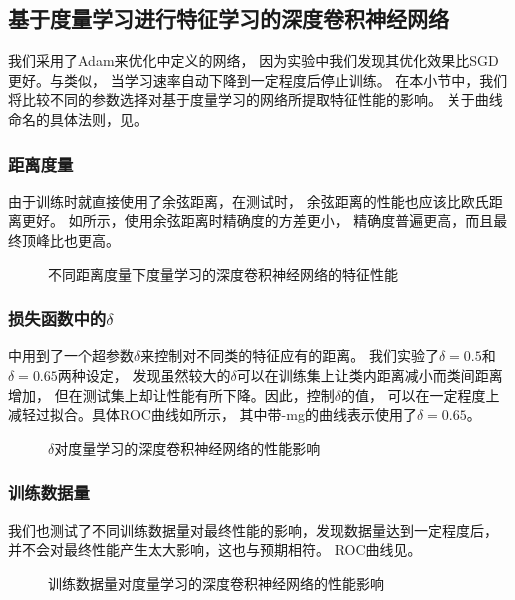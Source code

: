 \subsection{基于度量学习进行特征学习的深度卷积神经网络}
我们采用了Adam\cite{kingma2014adam}来优化中定义的网络，
因为实验中我们发现其优化效果比SGD更好。与类似，
当学习速率自动下降到一定程度后停止训练。
在本小节中，我们将比较不同的参数选择对基于度量学习的网络所提取特征性能的影响。
关于曲线命名的具体法则，见。

\subsubsection{距离度量}
由于训练时就直接使用了余弦距离，在测试时，
余弦距离的性能也应该比欧氏距离更好。
如所示，使用余弦距离时精确度的方差更小，
精确度普遍更高，而且最终顶峰比也更高。

\begin{figure}[h!]
    \caption{不同距离度量下度量学习的深度卷积神经网络的特征性能}
    \label{fig:expr:curve:mtrc:measure}
\end{figure}

\subsubsection{损失函数中的$\delta$}
中用到了一个超参数$\delta$来控制对不同类的特征应有的距离。
我们实验了$\delta=0.5$和$\delta=0.65$两种设定，
发现虽然较大的$\delta$可以在训练集上让类内距离减小而类间距离增加，
但在测试集上却让性能有所下降。因此，控制$\delta$的值，
可以在一定程度上减轻过拟合。具体ROC曲线如所示，
其中带-mg的曲线表示使用了$\delta=0.65$。

\begin{figure}[h!]
    \caption{$\delta$对度量学习的深度卷积神经网络的性能影响}
    \label{fig:expr:curve:mtrc:delta}
\end{figure}

\subsubsection{训练数据量}
我们也测试了不同训练数据量对最终性能的影响，发现数据量达到一定程度后，
并不会对最终性能产生太大影响，这也与预期相符。
ROC曲线见。
\begin{figure}[h!]
    \caption{训练数据量对度量学习的深度卷积神经网络的性能影响}
    \label{fig:expr:curve:mtrc:datasize}
\end{figure}

